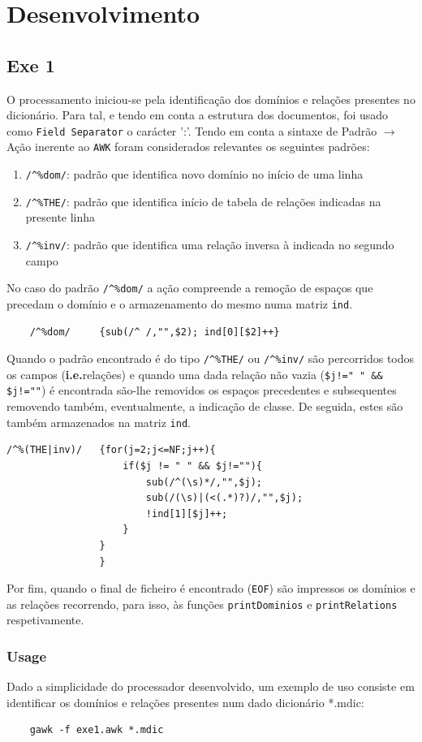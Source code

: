 \documentclass{llncs}
\begin{document}
\section{Desenvolvimento}
\subsection{Exe 1}
O processamento iniciou-se pela identificação dos domínios e relações presentes no dicionário. Para tal, e tendo em conta a estrutura dos documentos, foi usado como \texttt{Field Separator} o carácter ':'.
Tendo em conta a sintaxe de Padrão $\to$ Ação inerente ao \texttt{AWK} foram considerados relevantes os seguintes padrões:
\begin{enumerate}
    \item \verb|/^%dom/|: padrão que identifica novo domínio no início de uma linha
    \item \verb|/^%THE/|: padrão que identifica início de tabela de relações indicadas na presente linha
    \item \verb|/^%inv/|: padrão que identifica uma relação inversa à indicada no segundo campo
\end{enumerate}
No caso do padrão \verb|/^%dom/| a ação compreende a remoção de espaços que precedam o domínio e o armazenamento do mesmo numa matriz \texttt{ind}.
\begin{Verbatim}
    /^%dom/     {sub(/^ /,"",$2); ind[0][$2]++}
\end{Verbatim}
Quando o padrão encontrado é do tipo \verb|/^%THE/| ou \verb|/^%inv/| são percorridos todos os campos (\textbf{i.e.}relações) e quando uma dada relação não vazia (\verb|$j!=" " && $j!=""|) é encontrada são-lhe removidos os espaços precedentes e subsequentes removendo também, eventualmente, a indicação de classe. De seguida, estes são também armazenados na matriz \texttt{ind}.
\begin{Verbatim}
/^%(THE|inv)/   {for(j=2;j<=NF;j++){
                    if($j != " " && $j!=""){
                        sub(/^(\s)*/,"",$j);
                        sub(/(\s)|(<(.*)?)/,"",$j);
                        !ind[1][$j]++;
                    }
                }
                }
\end{Verbatim}

Por fim, quando o final de ficheiro é encontrado (\texttt{EOF}) são impressos os domínios e as relações recorrendo, para isso, às funções \texttt{printDominios} e \texttt{printRelations} respetivamente.

\subsubsection{Usage}
Dado a simplicidade do processador desenvolvido, um exemplo de uso consiste em identificar os domínios e relações presentes num dado dicionário *.mdic:
\begin{Verbatim}
    gawk -f exe1.awk *.mdic
\end{Verbatim}
\end{document}
